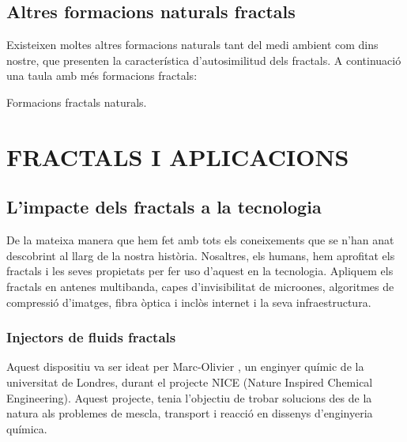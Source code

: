 \documentclass[12pt,a4paper]{report}
\begin{document}
\section{Altres formacions naturals fractals}
Existeixen moltes altres formacions naturals tant del medi ambient com dins nostre, que presenten la característica d'autosimilitud dels fractals. A continuació una taula amb més formacions fractals:
\begin{table}[!ht]
\centering
{}
\caption{Formacions fractals naturals.}
\end{table}

\chapter{FRACTALS I APLICACIONS}
\section{L'impacte dels fractals a la tecnologia}
De la mateixa manera que hem fet amb tots els coneixements que se n'han anat descobrint al llarg de la nostra història. Nosaltres, els humans, hem aprofitat els fractals i les seves propietats per fer uso d'aquest en la tecnologia. Apliquem els fractals en antenes multibanda, capes d'invisibilitat de microones, algoritmes de compressió d'imatges, fibra òptica i inclòs internet i la seva infraestructura. 
\subsection{Injectors de fluids fractals}
Aquest dispositiu va ser ideat per Marc-Olivier \cite[p.~90]{FractalWorlds}, un enginyer químic de la universitat de Londres, durant el projecte NICE (Nature Inspired Chemical Engineering). Aquest projecte, tenia l'objectiu de trobar solucions des de la natura als problemes de mescla, transport i reacció en dissenys d'enginyeria química. 
\end{document}
